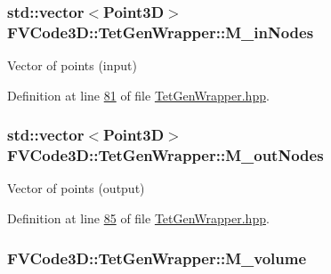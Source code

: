 \subsubsection[{\texorpdfstring{M\+\_\+in\+Nodes}{M_inNodes}}]{\setlength{\rightskip}{0pt plus 5cm}std\+::vector$<${\bf Point3D}$>$ F\+V\+Code3\+D\+::\+Tet\+Gen\+Wrapper\+::\+M\+\_\+in\+Nodes\hspace{0.3cm}{\ttfamily [private]}}\hypertarget{classFVCode3D_1_1TetGenWrapper_ae0637911dffc55fc74b5414fc6e8e417}{}\label{classFVCode3D_1_1TetGenWrapper_ae0637911dffc55fc74b5414fc6e8e417}


Vector of points (input) 



Definition at line \hyperlink{TetGenWrapper_8hpp_source_l00081}{81} of file \hyperlink{TetGenWrapper_8hpp_source}{Tet\+Gen\+Wrapper.\+hpp}.

\subsubsection[{\texorpdfstring{M\+\_\+out\+Nodes}{M_outNodes}}]{\setlength{\rightskip}{0pt plus 5cm}std\+::vector$<${\bf Point3D}$>$ F\+V\+Code3\+D\+::\+Tet\+Gen\+Wrapper\+::\+M\+\_\+out\+Nodes\hspace{0.3cm}{\ttfamily [private]}}\hypertarget{classFVCode3D_1_1TetGenWrapper_a04672b7a2b60730190e0e82af43ed38b}{}\label{classFVCode3D_1_1TetGenWrapper_a04672b7a2b60730190e0e82af43ed38b}


Vector of points (output) 



Definition at line \hyperlink{TetGenWrapper_8hpp_source_l00085}{85} of file \hyperlink{TetGenWrapper_8hpp_source}{Tet\+Gen\+Wrapper.\+hpp}.

\subsubsection[{\texorpdfstring{M\+\_\+volume}{M_volume}}]{ F\+V\+Code3\+D\+::\+Tet\+Gen\+Wrapper\+::\+M\+\_\+volume\hspace{0.3cm}{\ttfamily [private]}}\hypertarget{classFVCode3D_1_1TetGenWrapper_a820391e6d290e49db68b107fd5ab0e75}{}\label{classFVCode3D_1_1TetGenWrapper_a820391e6d290e49db68b107fd5ab0e75}


